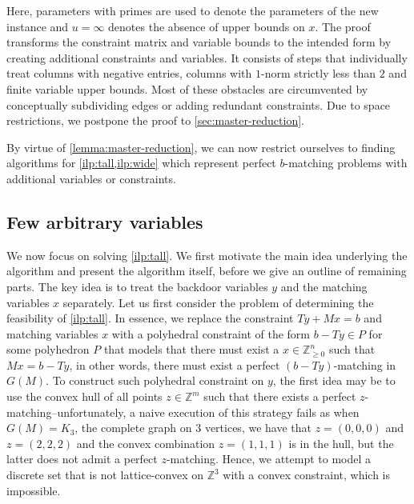 \documentclass[a4paper,UKenglish,cleveref,thm-restate]{lipics-v2021}
\newcommand{\Z}{\mathbb Z}
\newcommand{\vecinfty}{\bm\infty}
\begin{document}
Here, parameters with primes are used to denote the parameters of the new instance and $u=\vecinfty$ denotes the absence of upper bounds on $x$. The proof transforms the constraint matrix and variable bounds to the intended form by creating additional constraints and variables. It consists of steps that individually treat columns with negative entries, columns with $1$-norm strictly less than $2$ and finite variable upper bounds. Most of these obstacles are circumvented by conceptually subdividing edges or adding redundant constraints. Due to space restrictions, we postpone the proof to \cref{sec:master-reduction}. 

By virtue of \cref{lemma:master-reduction}, we can now restrict ourselves to finding algorithms for \cref{ilp:tall,ilp:wide} which represent perfect $b$-matching problems with additional variables or constraints.

\subsection{Few arbitrary variables}
\label{sec:overview-few-arbitrary-variables}

We now focus on solving \cref{ilp:tall}. We first motivate the main idea underlying the algorithm and present the algorithm itself, before we give an outline of remaining parts. The key idea is to treat the backdoor variables $y$ and the matching variables $x$ separately. Let us first consider the problem of determining the feasibility of \cref{ilp:tall}. In essence, we replace the constraint $Ty+Mx=b$ and matching variables $x$ with a polyhedral constraint of the form $b-Ty\in P$ for some polyhedron $P$ that models that there must exist a $x\in\Z_{\ge0}^n$ such that $Mx=b-Ty$, in other words, there must exist a perfect $(b-Ty)$-matching in $G(M)$. To construct such polyhedral constraint on $y$, the first idea may be to use the convex hull of all points $z\in\Z^m$ such that there exists a perfect $z$-matching--unfortunately, a naive execution of this strategy fails as when $G(M)=K_3$, the complete graph on $3$ vertices, we have that $z=(0,0,0)$ and $z=(2,2,2)$ and the convex combination $z=(1,1,1)$ is in the hull, but the latter does not admit a perfect $z$-matching. Hence, we attempt to model a discrete set that is not lattice-convex on $\Z^3$ with a convex constraint, which is impossible.
\end{document}
